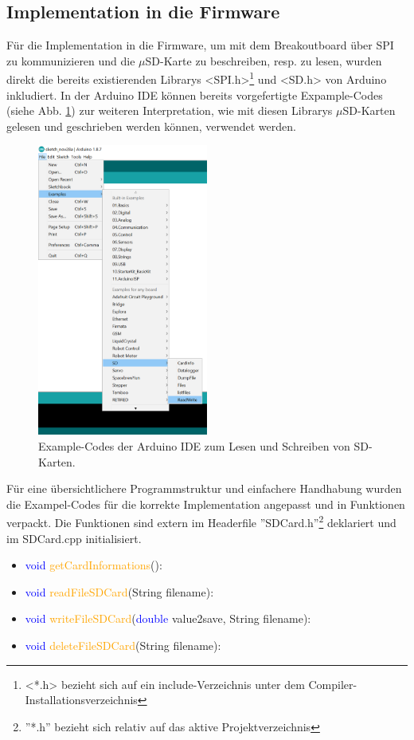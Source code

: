 \subsection{Implementation in die Firmware}
Für die Implementation in die Firmware, um mit dem Breakoutboard über SPI zu kommunizieren und die $\mu$SD-Karte zu beschreiben, resp. zu lesen, wurden direkt die bereits existierenden Librarys <SPI.h>\footnote{ <*.h> bezieht sich auf ein include-Verzeichnis unter dem Compiler-Installationsverzeichnis} und <SD.h> von Arduino inkludiert. In der Arduino IDE können bereits vorgefertigte Expample-Codes (siehe Abb. \ref{fig:exampleCodes}) zur weiteren Interpretation, wie mit diesen Librarys $\mu$SD-Karten gelesen und geschrieben werden können, verwendet werden.\\
\begin{figure}[h]
\centering
\includegraphics[width=0.5\textwidth]{graphics/Datenspeicherung/read_write_examples.PNG}
\caption{Example-Codes der Arduino IDE zum Lesen und Schreiben von SD-Karten.}
\label{fig:exampleCodes}
\end{figure}

Für eine übersichtlichere Programmstruktur und einfachere Handhabung wurden die Exampel-Codes für die korrekte Implementation angepasst und in Funktionen verpackt. Die Funktionen sind extern im Headerfile ''SDCard.h''\footnote{ ''*.h'' bezieht sich relativ auf das aktive Projektverzeichnis} deklariert und im SDCard.cpp initialisiert.
\begin{itemize}
\item \textcolor{blue}{void} \textcolor{orange}{getCardInformations}():
\item \textcolor{blue}{void} \textcolor{orange}{readFileSDCard}(\textcolor{Dandelion}{String} filename): 
\item \textcolor{blue}{void} \textcolor{orange}{writeFileSDCard}(\textcolor{blue}{double} value2save, \textcolor{Dandelion}{String} filename): 
\item \textcolor{blue}{void} \textcolor{orange}{deleteFileSDCard}(\textcolor{Dandelion}{String} filename): 
\end{itemize}